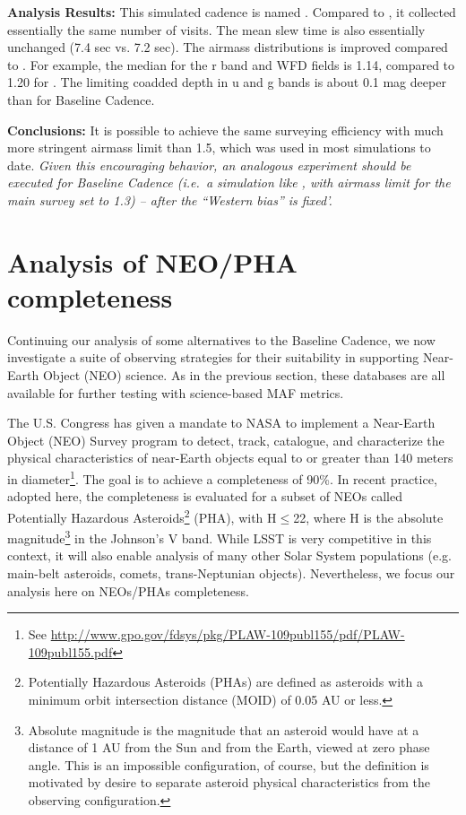  {\bf Analysis Results:}  This simulated cadence is named
 . Compared to
 , it collected essentially the same number of
 visits. The mean slew time is also essentially unchanged (7.4 sec vs.
 7.2 sec). The airmass distributions is improved compared to
 . For example, the median for the r band and
 WFD fields is 1.14, compared to 1.20 for .  The
 limiting coadded depth in u and g bands is about 0.1 mag deeper than
 for Baseline Cadence.

{\bf Conclusions:}  It is possible to achieve the same surveying
efficiency with much more stringent airmass limit than 1.5, which was
used in most simulations to date.  {\it Given this encouraging
behavior, an analogous experiment should be executed for Baseline
Cadence (i.e.\ a simulation like , with airmass
limit for the main survey set to 1.3) -- after the ``Western bias'' is
fixed'.}

\navigationbar


\section{Analysis of NEO/PHA completeness}
\def\secname{cadexp:NEOs}\label{sec:\secname}


Continuing our analysis of some alternatives to the Baseline Cadence,
we now investigate a suite of observing strategies for their
suitability in supporting Near-Earth Object (NEO) science. As in the
previous section, these \OpSim databases are all available for further
testing with science-based MAF metrics.

The U.S. Congress has given a mandate to NASA to implement a
Near-Earth Object (NEO) Survey program to detect, track, catalogue,
and characterize the physical characteristics of near-Earth objects
equal to or greater than 140 meters in diameter\footnote{See
\url{http://www.gpo.gov/fdsys/pkg/PLAW-109publ155/pdf/PLAW-109publ155.pdf}}.
The goal is to achieve a completeness of 90\%. In recent practice,
adopted here, the completeness is evaluated for a subset of NEOs
called Potentially Hazardous Asteroids\footnote{ Potentially Hazardous
Asteroids (PHAs) are defined as asteroids with a minimum orbit
intersection distance (MOID) of 0.05 AU or less.}  (PHA), with
H$\le$22, where H is the absolute magnitude\footnote{Absolute
magnitude is the magnitude that an asteroid would have at a distance
of 1 AU from the Sun and from the Earth, viewed at zero phase angle.
This is an impossible configuration, of course, but the definition is
motivated by desire to separate asteroid physical characteristics from
the observing configuration.} in the Johnson's V band. While LSST is
very competitive in this context, it will also enable analysis of many
other Solar System populations (e.g. main-belt asteroids, comets,
trans-Neptunian objects). Nevertheless, we focus our analysis here on
NEOs/PHAs completeness.



